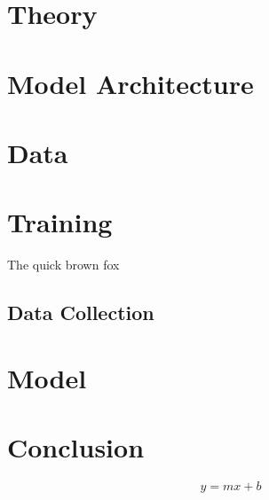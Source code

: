 \section{Theory}
\section{Model Architecture}
\section{Data}
\section{Training}

\lipsum[12]
\begin{table}
  \centering
  \caption{The quick brown fox}
  
\end{table}
\lipsum[13]
\subsection{Data Collection}
\lipsum[16]
\section{Model}
\section{Conclusion}
\lipsum[20]
\begin{equation}
  y = mx + b
\end{equation}
\lipsum[22-25]